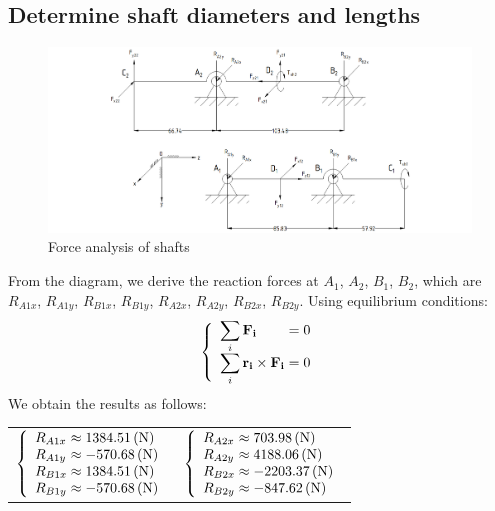 \subsection{Determine shaft diameters and lengths}

\begin{figure}[ht]
	\centering
	\includegraphics[width=175mm]{shaft.png}
	\caption{Force analysis of shafts}
	\label{force on shaft}
\end{figure}
From the diagram, we derive the reaction forces at $ A_1 $, $ A_2 $, $ B_1 $, $ B_2 $, which are $ R_{A1x} $, $ R_{A1y} $, $ R_{B1x} $, $ R_{B1y} $, $ R_{A2x} $, $ R_{A2y} $, $ R_{B2x} $, $ R_{B2y} $. Using equilibrium conditions:
\[
\left\{ 
\begin{array}{l@{{}={}}l}
\displaystyle\sum_{i} \mathbf{F_{i}} & 0\\
\displaystyle\sum_{i} \mathbf{r_i}\times \mathbf{F_i}& 0\\
\end{array}
\right.
\]
We obtain the results as follows:
\begin{table}[ht]
	\centering
	\begin{tabular}{p{7cm}p{7cm}}
		$
		\left\{ 
		\begin{array}{l@{{} \approx {}}l}
		R_{A1x} & 1384.51\unit{(N)}\\
		R_{A1y} & -570.68\unit{(N)}\\
		R_{B1x} & 1384.51\unit{(N)}\\
		R_{B1y} & -570.68\unit{(N)}\\
		\end{array}
		\right.
		$ & $
		\left\{ 
		\begin{array}{l@{{} \approx {}}l}
		R_{A2x} & 703.98\unit{(N)}\\
		R_{A2y} & 4188.06\unit{(N)}\\
		R_{B2x} & -2203.37\unit{(N)}\\
		R_{B2y} & -847.62\unit{(N)}\\
		\end{array}
		\right.
		$
	\end{tabular}
\end{table}

